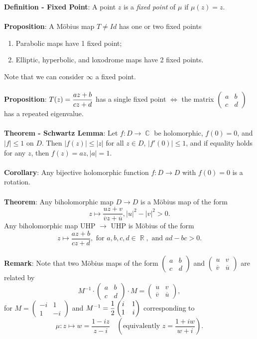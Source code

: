 \documentclass{article}
\DeclareMathOperator{\R}{\mathbb{R}}
\DeclareMathOperator{\C}{\mathbb{C}}
\begin{document}
\textbf{Definition - Fixed Point}: A point $z$ is a \textit{fixed point} of $\mu$ if $\mu(z) = z$. \\ \\
\textbf{Proposition}: A Möbius map $T \neq Id$ has one or two fixed points \begin{enumerate}
    \item Parabolic maps have 1 fixed point;
    \item Elliptic, hyperbolic, and loxodrome maps have 2 fixed points.
\end{enumerate} Note that we can consider $\infty$ a fixed point. \\ \\
\textbf{Proposition}: $T(z) = \mathlarger{\frac{az + b}{cz + d}}$ has a single fixed point $\iff$ the matrix $\begin{pmatrix}
    a & b \\
    c & d
\end{pmatrix}$ has a repeated eigenvalue. \\ \\
\textbf{Theorem - Schwartz Lemma}: Let $f: D \rightarrow \C$ be holomorphic, $f(0) = 0$, and $|f| \leq 1$ on $D$. Then $|f(z)| \leq |z|$ for all $z \in D$, $|f'(0)| \leq 1$, and if equality holds for any $z$, then $f(z) = az, |a| = 1$. \\ \\
\textbf{Corollary}: Any bijective holomorphic function $f: D \rightarrow D$ with $f(0) = 0$ is a rotation. \\ \\
\textbf{Theorem}: Any biholomorphic map $D \rightarrow D$ is a Möbius map of the form $$z \mapsto \frac{uz + v}{\overline{v}z + \overline{u}}, |u|^2 - |v|^2 > 0.$$ Any biholomorphic map UHP $\rightarrow$ UHP is Möbius of the form $$z \mapsto \frac{az + b}{cz + d}, \text{ for } a, b, c, d \in \R, \text{ and } ad - bc > 0.$$ \\
\textbf{Remark}: Note that two Möbius maps of the form $\begin{pmatrix}
    a & b \\
    c & d
\end{pmatrix}$ and $\begin{pmatrix}
    u & v \\
    \overline{v} & \overline{u}
\end{pmatrix}$ are related by $$M^{-1} \cdot \begin{pmatrix}
    a & b \\
    c & d
\end{pmatrix} \cdot M = \begin{pmatrix}
    u & v \\
    \overline{v} & \overline{u}
\end{pmatrix},$$ for $M = \begin{pmatrix}
    -i & 1 \\
    1 & -i
\end{pmatrix}$ and $M^{-1} = \mathlarger{\frac{1}{2}} \begin{pmatrix}
    i & 1 \\
    1 & i
\end{pmatrix}$ corresponding to $$\mu: z \mapsto w = \frac{1 - iz}{z - i} \quad \left( \text{equivalently } z = \frac{1 + iw}{w + i} \right).$$ \\
\end{document}
